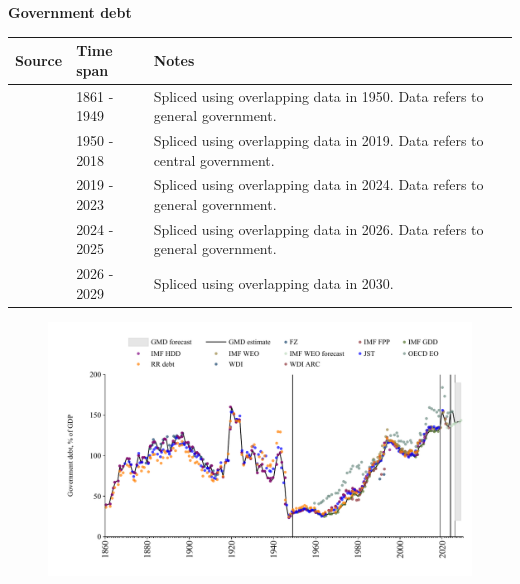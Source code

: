 \documentclass[12pt,a4paper,landscape]{article}
\begin{document}
\begin{adjustbox}{max totalsize={\paperwidth}{\paperheight},center}
\begin{minipage}[t][\textheight][t]{\textwidth}
\vspace*{0.5cm}
{}
\begin{center}
{\Large\bfseries Government debt}
\end{center}
\vspace{0.5cm}
\begin{table}[H]
\centering
\small
\begin{tabular}{|l|l|l|}
\hline
\textbf{Source} & \textbf{Time span} & \textbf{Notes} \\
\hline
\rowcolor{white}\cite{IMF_FPP}& 1861 - 1949 &Spliced using overlapping data in 1950. Data refers to general government.\\
\rowcolor{lightgray}\cite{IMF_GDD}& 1950 - 2018 &Spliced using overlapping data in 2019. Data refers to central government.\\
\rowcolor{white}\cite{IMF_FPP}& 2019 - 2023 &Spliced using overlapping data in 2024. Data refers to general government.\\
\rowcolor{lightgray}\cite{OECD_EO}& 2024 - 2025 &Spliced using overlapping data in 2026. Data refers to general government.\\
\rowcolor{white}\cite{IMF_WEO_forecast}& 2026 - 2029 &Spliced using overlapping data in 2030. \\
\hline
\end{tabular}
\end{table}
\begin{figure}[H]
\centering
\includegraphics[width=\textwidth,height=0.6\textheight,keepaspectratio]{graphs/ITA_govdebt_GDP.pdf}
\end{figure}
\end{minipage}
\end{adjustbox}
\end{document}
